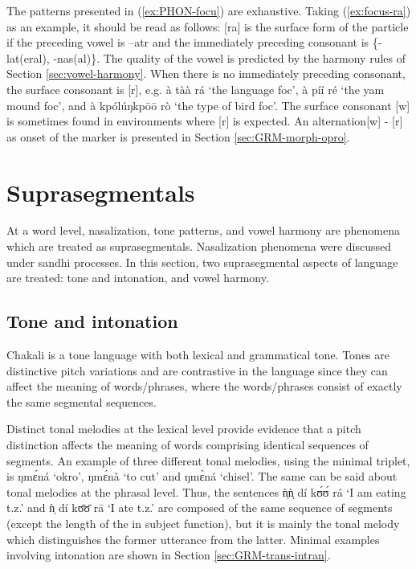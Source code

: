 The patterns presented in (\ref{ex:PHON-focu}) are exhaustive. Taking (\ref{ex:focus-ra}) as an example, it should be read as follows: [ra] is the surface form of the  particle if the preceding vowel is   {\sc --atr} and the immediately preceding consonant is \{{\sc -lat(eral), -nas(al)}\}. The quality of the vowel is predicted by the harmony rules of Section \ref{sec:vowel-harmony}.  When there is no immediately preceding consonant,  the surface consonant is [r], e.g. {\sls à tàà rá} `the language {\sc foc}', {\sls  à píí ré} `the yam mound {\sc foc}', and {\sls à kpólúŋkpōō rò} `the type of bird {\sc foc}'.   The surface consonant  [{w}] is sometimes found in  environments where  [{r}] is expected. An alternation[{w}] - [{r}] as onset of the  marker is presented in Section \ref{sec:GRM-morph-opro}.


\section{Suprasegmentals}
\label{sec:suprasegmentals}


At a word level,  nasalization, tone patterns, and vowel harmony are phenomena which are treated as suprasegmentals. Nasalization phenomena were discussed under sandhi processes.  In this section,  two suprasegmental aspects of language are treated: tone and intonation, and vowel harmony.



\subsection{Tone and intonation}
\label{sec:tone-intonation}


Chakali is a tone language with both lexical and grammatical tone. Tones are distinctive pitch variations and are contrastive in the language since they can affect the meaning of  words/phrases, where the words/phrases consist of exactly the same segmental sequences.

Distinct tonal melodies at the lexical level provide evidence that a pitch distinction affects the meaning of words comprising identical sequences of segments.  An example of three different tonal melodies, using the minimal triplet, is   {\sls ŋmɛ́ná} `okro', {\sls ŋmɛ́nà} `to cut' and {\sls ŋmɛ̀ná}   `chisel'. The same can be said about tonal melodies at the phrasal level. Thus, the sentences {\sls ǹ̩ǹ̩ dí kʊ́ʊ́ rá} `I am eating t.z.' and {\sls ǹ̩ dí kʊ̄ʊ̄ rā} `I ate t.z.' are composed of the same sequence of segments (except the length of the  in subject function), but it is mainly  the tonal melody which distinguishes the former utterance from the latter.   Minimal examples involving intonation are shown  in Section \ref{sec:GRM-trans-intran}.


